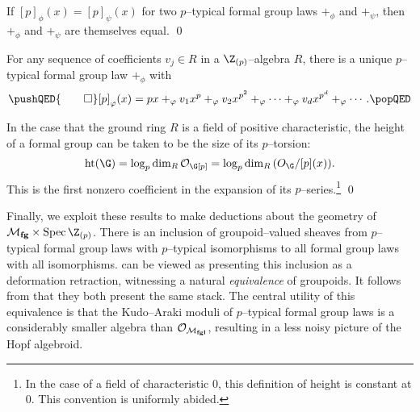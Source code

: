\begin{corollary}\label{PSeriesDetermines}
If \([p]_\phi(x) = [p]_\psi(x)\) for two \(p\)--typical formal group laws \(+_\phi\) and \(+_\psi\), then \(+_\phi\) and \(+_\psi\) are themselves equal. \qed
\end{corollary}

\begin{corollary}\label{EveryPSeriesArises}
For any sequence of coefficients \(v_j \in R\) in a \(\Z_{(p)}\)--algebra \(R\), there is a unique \(p\)--typical formal group law \(+_\phi\) with
\[\pushQED{\qed}
[p]_\phi(x) = px +_\phi v_1 x^p +_\phi v_2 x^{p^2} +_\phi \cdots +_\phi v_d x^{p^d} +_\phi \cdots. \qedhere
\popQED\]
\end{corollary}

\begin{corollary}
In the case that the ground ring \(R\) is a field of positive characteristic, the height of a formal group can be taken to be the size of its \(p\)--torsion: \[\height(\G) = \log_p \dim_R \sheaf O_{\G[p]} = \log_p \dim_R \sheaf (O_{\G} / [p](x)).\]  This is the first nonzero coefficient in the expansion of its \(p\)--series.\footnote{In the case of a field of characteristic \(0\), this definition of height is constant at \(0\).  This convention is uniformly abided.} \qed
\end{corollary}

Finally, we exploit these results to make deductions about the geometry of \(\moduli{fg} \times \Spec \Z_{(p)}\).  There is an inclusion of groupoid--valued sheaves from \(p\)--typical formal group laws with \(p\)--typical isomorphisms to all formal group laws with all isomorphisms.   can be viewed as presenting this inclusion as a deformation retraction, witnessing a natural \emph{equivalence} of groupoids.  It follows from  that they both present the same stack.  The central utility of this equivalence is that the Kudo--Araki moduli of \(p\)--typical formal group laws is a considerably smaller algebra than \(\mathcal{O}_{\mathcal{M}_{\mathbf{fgl}}}\), resulting in a less noisy picture of the Hopf algebroid.

